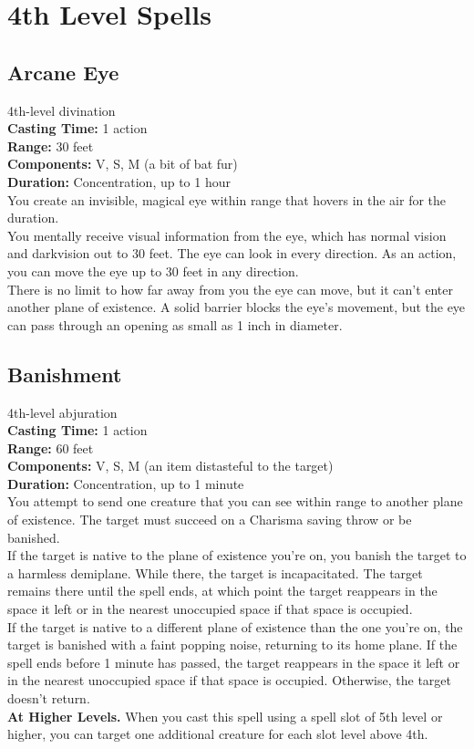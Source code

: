 \documentclass[11pt, A4paper, english]{article}
\begin{document}
	\section{4th Level Spells}
		\subsection{Arcane Eye}
4th-level divination \\
\textbf{Casting Time:} 1 action \\
\textbf{Range:} 30 feet \\
\textbf{Components:} V, S, M (a bit of bat fur) \\
\textbf{Duration:} Concentration, up to 1 hour \\
You create an invisible, magical eye within range that hovers in the air for the duration. \\
You mentally receive visual information from the eye, which has normal vision and darkvision out to 30 feet. The eye can look in every direction. As an action, you can move the eye up to 30 feet in any direction. \\
There is no limit to how far away from you the eye can move, but it can’t enter another plane of existence. A solid barrier blocks the eye’s movement, but the eye can pass through an opening as small as 1 inch in diameter.

		\subsection{Banishment}
4th-level abjuration \\
\textbf{Casting Time:} 1 action \\
\textbf{Range:} 60 feet \\
\textbf{Components:} V, S, M (an item distasteful to the target) \\
\textbf{Duration:} Concentration, up to 1 minute \\
You attempt to send one creature that you can see within range to another plane of existence. The target must succeed on a Charisma saving throw or be banished. \\
If the target is native to the plane of existence you’re on, you banish the target to a harmless demiplane. While there, the target is incapacitated. The target remains there until the spell ends, at which point the target reappears in the space it left or in the nearest unoccupied space if that space is occupied. \\
If the target is native to a different plane of existence than the one you’re on, the target is banished with a faint popping noise, returning to its home plane. If the spell ends before 1 minute has passed, the target reappears in the space it left or in the nearest unoccupied space if that space is occupied. Otherwise, the target doesn't return. \\
\textbf{At Higher Levels.} When you cast this spell using a spell slot of 5th level or higher, you can target one additional creature for each slot level above 4th.
\end{document}
